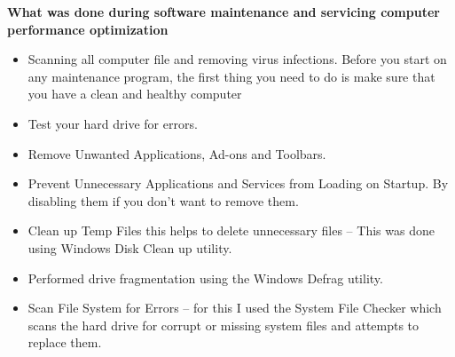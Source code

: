 \textbf{What was done during software maintenance and servicing computer performance optimization }\\
\begin{itemize}
\item Scanning all computer file and removing virus infections. Before you start on any maintenance program, the first thing you need to do is make sure that you have a clean and healthy computer 
\item Test your hard drive for errors.
\item Remove Unwanted Applications, Ad-ons and Toolbars.
\item Prevent Unnecessary Applications and Services from Loading on Start­up. By disabling them if you don’t want to remove them.
\item Clean up Temp Files this helps to delete unnecessary files – This was done using Windows Disk Clean up utility.
\item Performed drive fragmentation using the Windows Defrag utility.
\item Scan File System for Errors​ –​ for this I used the System File Checker which scans the hard drive for corrupt or missing system files and attempts to replace them.
\end{itemize}

